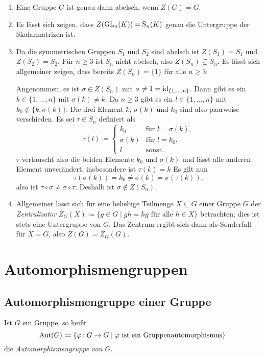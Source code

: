 \begin{bsp}
 \begin{enumerate}[leftmargin=*]
  \item
   Eine Gruppe $G$ ist genau dann abelsch, wenn $Z(G) = G$.
  \item
   Es lässt sich zeigen, dass $Z(\mathrm{GL}_n(K)) = \mathrm{S}_n(K)$ genau die Untergruppe der Skalarmatrizen ist.
  \item
   Da die symmetrischen Gruppen $S_1$ und $S_2$ sind abelsch ist $Z(S_1) = S_1$ und \mbox{$Z(S_2) = S_2$}. Für $n \geq 3$ ist $S_n$ nicht abelsch, also $Z(S_n) \subsetneq S_n$. Es lässt sich allgemeiner zeigen, dass bereits $Z(S_n) = \{1\}$ für alle $n \geq 3$:
   
   Angenommen, es ist $\sigma \in Z(S_n)$ mit $\sigma \neq 1 = \mathrm{id}_{\{1,\dotsc,n\}}$. Dann gibt es ein $k \in \{1, \dotsc, n\}$ mit $\sigma(k) \neq k$. Da $n \geq 3$ gibt es ein $l \in \{1, \dotsc, n\}$ mit $k_0 \notin \{k, \sigma(k)\}$. Die drei Element $k$, $\sigma(k)$ und $k_0$ sind also paarweise verschieden. Es sei $\tau \in S_n$ definiert als
   \[
    \tau(l) \coloneqq
    \begin{cases}
     k_0       & \text{für $l = \sigma(k)$}, \\
     \sigma(k) & \text{für $l = k_0$}, \\
     l         & \text{sonst}.
    \end{cases}
   \]
   $\tau$ vertauscht also die beiden Elemente $k_0$ und $\sigma(k)$ und lässt alle anderen Element unverändert; insbesondere ist $\tau(k) = k$ Es gilt nun
   \[
   \tau(\sigma(k)) = k_0 \neq \sigma(k) = \sigma(\tau(k)),
   \]
   also ist $\tau \circ \sigma \neq \sigma \circ \tau$. Deshalb ist $\sigma \notin Z(S_n)$.
  \item
   Allgemeiner lässt sich für eine beliebige Teilmenge $X \subseteq G$ einer Gruppe $G$ der \emph{Zentralisator} $Z_G(X) \coloneqq \{g \in G \mid \text{$gh = hg$ für alle $h \in X$}\}$ betrachten; dies ist stets eine Untergruppe von $G$. Das Zentrum ergibt sich dann als Sonderfall für $X = G$, also $Z(G) = Z_G(G)$.
 \end{enumerate}
\end{bsp}





\section{Automorphismengruppen}


\subsection{Automorphismengruppe einer Gruppe}\label{ssec: automorphism group of a group}
\begin{defi}
 Ist $G$ ein Gruppe, so heißt
 \[
  \mathrm{Aut}(G) \coloneqq \{\varphi \colon G \to G \mid \text{$\varphi$ ist ein Gruppenautomorphismus}\}
 \]
 die \emph{Automorphismengruppe von $G$}.
\end{defi}

